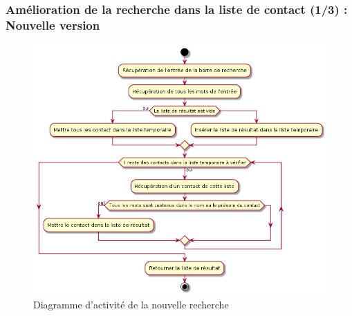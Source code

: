 \begin{frame}
	\frametitle{Amélioration de la recherche dans la liste de contact (1/3) : Nouvelle version}

    \begin{center}
	  \begin{figure}
        \includegraphics[scale=0.25]{images/activity_retrieve_better.png}
	   \caption{Diagramme d'activité de la nouvelle recherche}
	  \end{figure}
	\end{center}

\end{frame}